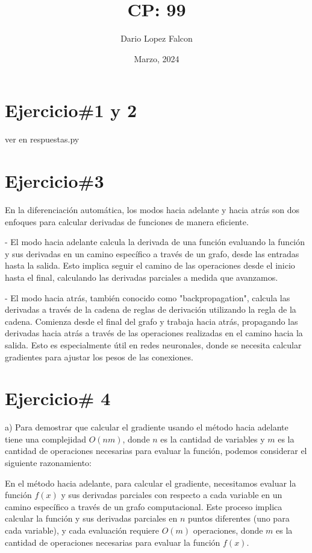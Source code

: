 \documentclass[a4paper,12pt]{article}
\begin{document}
\title{CP: 99}
\author{Dario Lopez Falcon}
\date{Marzo, 2024}
\maketitle

\section*{Ejercicio\#1 y 2}ver en respuestas.py

\section*{Ejercicio\#3}

En la diferenciación automática, los modos hacia adelante y hacia atrás son dos enfoques para calcular derivadas de funciones de manera eficiente. 

- El modo hacia adelante calcula la derivada de una función evaluando la función y sus derivadas en un camino específico a través de un grafo, desde 
las entradas hasta la salida. Esto implica seguir el camino de las operaciones desde el inicio hasta el final, calculando las derivadas parciales a medida que avanzamos.

- El modo hacia atrás, también conocido como "backpropagation", calcula las derivadas a través de la cadena de reglas de derivación utilizando la regla de la cadena. 
Comienza desde el final del grafo y trabaja hacia atrás, propagando las derivadas hacia atrás a través de las operaciones realizadas en el camino hacia la salida. 
Esto es especialmente útil en redes neuronales, donde se necesita calcular gradientes para ajustar los pesos de las conexiones.

\section*{Ejercicio\# 4}

a) Para demostrar que calcular el gradiente usando el método hacia adelante tiene una complejidad \( O(nm) \), donde \( n \) es la cantidad de variables y \( m \) 
es la cantidad de operaciones necesarias para evaluar la función, podemos considerar el siguiente razonamiento:

En el método hacia adelante, para calcular el gradiente, necesitamos evaluar la función \( f(x) \) y sus derivadas parciales con respecto a cada variable en un camino 
específico a través de un grafo computacional. Este proceso implica calcular la función y sus derivadas parciales en \( n \) puntos diferentes (uno para cada variable), 
y cada evaluación requiere \( O(m) \) operaciones, donde \( m \) es la cantidad de operaciones necesarias para evaluar la función \( f(x) \).
\end{document}
